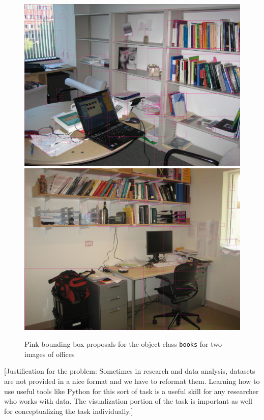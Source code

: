 \documentclass[12pt]{article}
\begin{document}
\begin{enumerate}
\begin{figure}
\includegraphics[scale=0.08]{mod_o_office_img_0011}
\includegraphics[scale=0.08]{mod_o_office_IMG_1533}
\centering
\caption{Pink bounding box proposals for the object class \texttt{books} for two images of offices}
\label{fig:boundingboxes}
\end{figure}

[Justification for the problem: Sometimes in research and data analysis, datasets are not provided in a nice format and we have to reformat them. Learning how to use useful tools like Python for this sort of task is a useful skill for any researcher who works with data. The visualization portion of the task is important as well for conceptualizing the task individually.]


\end{enumerate}
\end{document}
